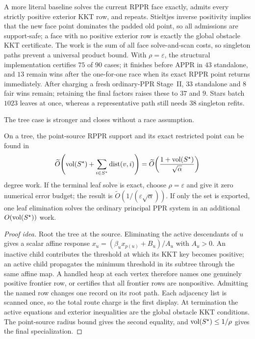 A more literal baseline solves the current RPPR face exactly, admits every
strictly positive exterior KKT row, and repeats.  Stieltjes inverse positivity
implies that the new face point dominates the padded old point, so all
admissions are support-safe; a face with no positive exterior row is exactly
the global obstacle KKT certificate.  The work is the sum of all face
solve-and-scan costs, so singleton paths prevent a universal product bound.
With $\rho=\varepsilon$, the structural implementation certifies $75$ of
$90$ cases; it finishes before APPR in $43$ standalone, and $13$ remain wins
after the one-for-one race when its exact RPPR point returns immediately.
After charging a fresh ordinary-PPR Stage~II, $33$ standalone and $8$ fair
wins remain; retaining the final factors raises these to $37$ and $9$.
Stars batch $1023$ leaves at once, whereas a
representative path still needs $38$ singleton refits.

The tree case is stronger and closes without a race assumption.
\begin{theorem}
\label{thm:short-tree-exact-support}
On a tree, the point-source RPPR support and its exact restricted point can be
found in
\begin{equation*}
 \widetilde O\!\left(
   \operatorname{vol}(S^\star)+\sum_{i\in S^\star}\operatorname{dist}(v,i)
 \right)
 =\widetilde O\!\left(
   \frac{1+\operatorname{vol}(S^\star)}{\sqrt\alpha}
 \right)
\end{equation*}
degree work.  If the terminal leaf solve is exact, choose
$\rho=\varepsilon$ and give it zero numerical error budget; the result is
$\widetilde O(1/(\varepsilon\sqrt\alpha))$.  If only the set is exported,
one leaf elimination solves the ordinary principal PPR system in an
additional $O(\operatorname{vol}(S^\star))$ work.
\end{theorem}

\begin{proof}[Proof idea]
Root the tree at the source.  Eliminating the active descendants of $u$
gives a scalar affine response
$x_u=(\beta_u x_{p(u)}+B_u)/A_u$ with $A_u>0$.  An inactive child contributes
the threshold at which its KKT key becomes positive; an active child
propagates the minimum threshold in its subtree through the same affine map.
A handled heap at each vertex therefore names one genuinely positive
frontier row, or certifies that all frontier rows are nonpositive.  Admitting
the named row changes one record on its root path.  Each adjacency list is
scanned once, so the total route charge is the first display.  At termination
the active equations and exterior inequalities are the global obstacle KKT
conditions.  The point-source radius bound gives the second equality, and
$\operatorname{vol}(S^\star)\leq1/\rho$ gives the final specialization.
\end{proof}

